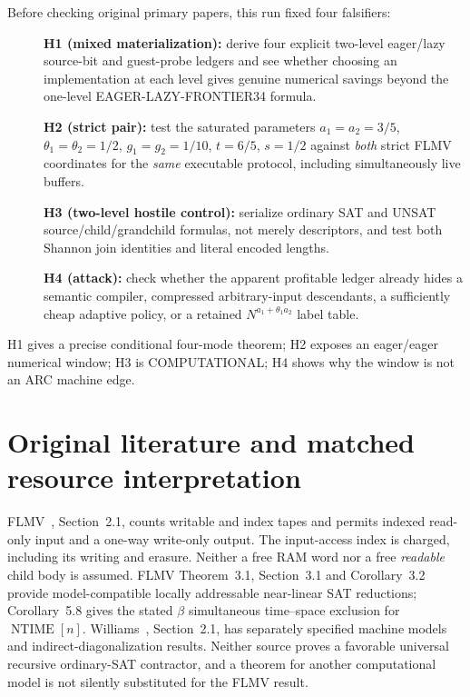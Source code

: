 \documentclass[11pt]{article}
\begin{document}
Before checking original primary papers, this run fixed four falsifiers:
\begin{description}
\item[] \textbf{H1 (mixed materialization):} derive four explicit
two-level eager/lazy source-bit and guest-probe ledgers and see
whether choosing an implementation at each level gives genuine
numerical savings beyond the one-level EAGER-LAZY-FRONTIER34 formula.
\item[] \textbf{H2 (strict pair):} test the saturated parameters
$a_1=a_2=3/5$, $\theta_1=\theta_2=1/2$, $g_1=g_2=1/10$,
$t=6/5$, $s=1/2$ against \emph{both} strict FLMV coordinates
for the \emph{same} executable protocol, including simultaneously live buffers.
\item[] \textbf{H3 (two-level hostile control):} serialize ordinary
SAT and UNSAT source/child/grandchild formulas, not merely descriptors,
and test both Shannon join identities and literal encoded lengths.
\item[] \textbf{H4 (attack):} check whether the apparent profitable
ledger already hides a semantic compiler, compressed arbitrary-input
descendants, a sufficiently cheap adaptive policy, or a retained
$N^{a_1+\theta_1a_2}$ label table.
\end{description}
H1 gives a precise conditional four-mode theorem; H2 exposes an
eager/eager numerical window; H3 is COMPUTATIONAL; H4 shows why
the window is not an ARC machine edge.

\section*{Original literature and matched resource interpretation}
FLMV~\cite{FLMV}, Section~2.1, counts writable and index tapes
and permits indexed read-only input and a one-way write-only output.
The input-access index is charged, including its writing and erasure.
Neither a free RAM word nor a free \emph{readable} child body is assumed.
FLMV Theorem~3.1, Section~3.1 and Corollary~3.2 provide
model-compatible locally addressable near-linear SAT reductions;
Corollary~5.8 gives the stated $\beta$ simultaneous
time--space exclusion for $\operatorname{NTIME}[n]$.
Williams~\cite{Williams}, Section~2.1, has separately specified
machine models and indirect-diagonalization results.
Neither source proves a favorable universal recursive ordinary-SAT
contractor, and a theorem for another computational model is not
silently substituted for the FLMV result.
\end{document}
